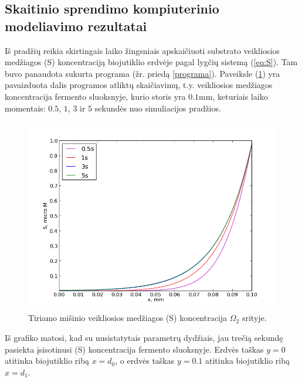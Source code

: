 \documentclass[12pt, a4paper, lithuanian]{article}
\begin{document}
\subsection{Skaitinio sprendimo kompiuterinio modeliavimo rezultatai}

Iš pradžių reikia skirtingais laiko žingsniais apskaičiuoti substrato veikliosios
medžiagos (S) koncentraciją biojutiklio erdvėje pagal lygčių sistemą (\ref{eq:S}).
Tam buvo panaudota sukurta programa (žr. priedą \ref{programa}). Paveiksle (\ref{img:S}) 
yra pavaizduota dalis programos atliktų skaičiavimų, t.y. veikliosios medžiagos koncentracija
fermento sluoksnyje, kurio storis yra $0.1$mm, keturiais laiko momentais: $0.5$, $1$,
$3$ ir $5$ sekundės nuo simuliacijos pradžios.
 \begin{figure}[H]
     \centering
     \includegraphics[scale=0.5]{img/kurS}
     \caption{Tiriamo mišinio veikliosios medžiagos (S) koncentracija
     $\Omega_2$ srityje.}
     \label{img:S}
 \end{figure}

Iš grafiko matosi, kad su nusistatytais parametrų dydžiais, jau trečią sekundę
pasiekta įsisotinusi (S) koncentracija fermento sluoksnyje. Erdvės taškas $y = 0$
atitinka biojutiklio ribą $x = d_0$, o erdvės taškas $y = 0.1$ atitinka
biojutiklio ribą $x = d_1$.
\end{document}
